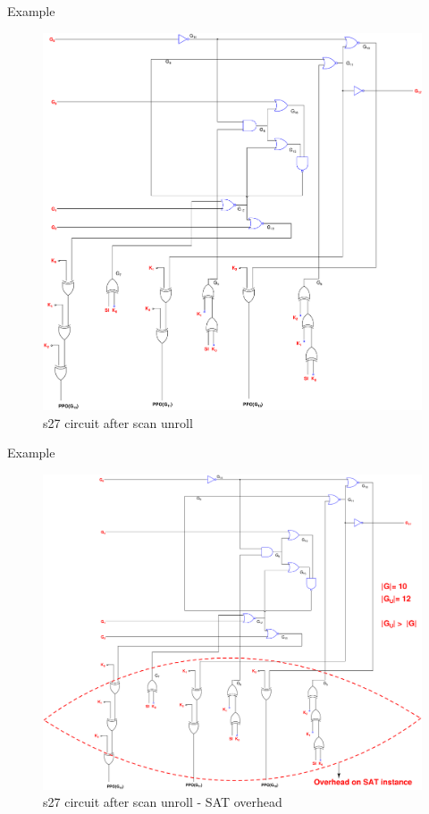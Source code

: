 \begin{frame}{Example}
\begin{figure}
\begin{center}
\caption{s27 circuit after scan unroll}
\label{fig:s27-after-scan-unroll}
\includegraphics[scale=0.12]{fig/s27_after_scanunroll.pdf}
\end{center}
\end{figure}
\end{frame}

\begin{frame}{Example}
\begin{figure}
\begin{center}
\caption{s27 circuit after scan unroll - SAT overhead}
\label{fig:s27-after-scan-unroll-SAT-overhead}
\includegraphics[scale=0.12]{fig/s27_after_scanunroll_SAToverhead.pdf}
\end{center}
\end{figure}
\end{frame}

